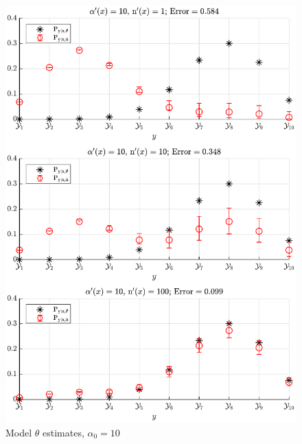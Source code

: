 \documentclass[12pt]{report}
\begin{document}
\begin{figure}
\centering
\includegraphics[scale=0.8]{P_yx_error_a0_10.pdf}
\caption{Model $\theta$ estimates, $\alpha_0 = 10$}
\label{fig:P_yx_error_a0_10}
\end{figure}
\end{document}
